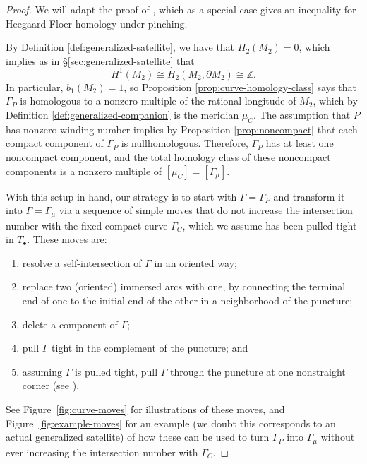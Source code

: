 \documentclass[11pt]{amsart}
\numberwithin{equation}{section}
\numberwithin{theorem}{section}
\theoremstyle{definition}
\newcommand{\Z}{\mathbb{Z}}
\begin{document}
\begin{proof}
We will adapt the proof of \cite[Theorem 7.15]{hrw}, which as a special case gives an inequality for Heegaard Floer homology under pinching. 

By Definition \ref{def:generalized-satellite}, we have that $H_2(M_2) = 0$, which implies as in \S\ref{sec:generalized-satellite} that \[H^1(M_2) \cong H_2(M_2,\partial M_2) \cong \Z.\] In particular, $b_1(M_2) = 1$, so Proposition \ref{prop:curve-homology-class} says that $\Gamma_P$ is homologous to a nonzero multiple of the rational longitude of $M_2$, which by Definition \ref{def:generalized-companion} is the meridian $\mu_C$. The assumption that $P$ has nonzero winding number implies by Proposition \ref{prop:noncompact} that each compact component of $\Gamma_P$ is nullhomologous. Therefore,  $\Gamma_P$ has at least one noncompact component, and the total homology class of these noncompact components is a nonzero multiple of $[\mu_C] = [\Gamma_\mu]$.

With this setup in hand, our strategy is to start with $\Gamma = \Gamma_P$ and transform it into $\Gamma = \Gamma_\mu$ via a sequence of simple moves that do not increase the intersection number with the fixed compact curve $\Gamma_C$, which we assume has been pulled tight in $T_\bullet$. These moves are:
\begin{enumerate}[label=(\roman*)]
    \item resolve a self-intersection of $\Gamma$ in an oriented way; \label{i:move1}
    \item replace two (oriented) immersed arcs with one, by connecting the terminal end of one to the initial end of the other in a neighborhood of the puncture; \label{i:move2}
    \item delete a component of $\Gamma$; \label{i:move3}
    \item pull $\Gamma$ tight in the complement of the puncture; and \label{i:move4}
    \item assuming $\Gamma$ is pulled tight, pull $\Gamma$ through the puncture at one nonstraight corner (see \cite[Figure 54]{hrw}). \label{i:move5}
\end{enumerate}
See Figure~\ref{fig:curve-moves} for illustrations of these moves, and Figure~\ref{fig:example-moves} for an example (we doubt this corresponds to an actual generalized satellite) of how these can be used to turn $\Gamma_P$ into $\Gamma_\mu$ without ever increasing the intersection number with $\Gamma_C$. 


\end{proof}
\end{document}

